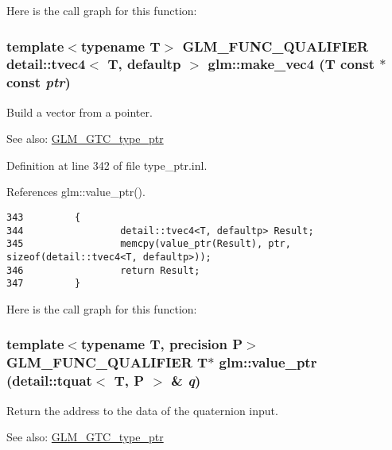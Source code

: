 Here is the call graph for this function:\hypertarget{group__gtc__type__ptr_gf44d3c8aa09a7a8021ae5312e2f1f091}{
\subsubsection[make\_\-vec4]{\setlength{\rightskip}{0pt plus 5cm}template$<$typename T$>$ GLM\_\-FUNC\_\-QUALIFIER detail::tvec4$<$ T, defaultp $>$ glm::make\_\-vec4 (T const $\ast$const  {\em ptr})}}
\label{group__gtc__type__ptr_gf44d3c8aa09a7a8021ae5312e2f1f091}


Build a vector from a pointer. \begin{Desc}
\item[See also:]\hyperlink{group__gtc__type__ptr}{GLM\_\-GTC\_\-type\_\-ptr} \end{Desc}


Definition at line 342 of file type\_\-ptr.inl.

References glm::value\_\-ptr().

\begin{Code}\begin{verbatim}343         {
344                 detail::tvec4<T, defaultp> Result;
345                 memcpy(value_ptr(Result), ptr, sizeof(detail::tvec4<T, defaultp>));
346                 return Result;
347         }
\end{verbatim}
\end{Code}




Here is the call graph for this function:\hypertarget{group__gtc__type__ptr_ga84b8d637d0b816514e2db6ce19cec6c}{
\subsubsection[value\_\-ptr]{\setlength{\rightskip}{0pt plus 5cm}template$<$typename T, precision P$>$ GLM\_\-FUNC\_\-QUALIFIER T$\ast$ glm::value\_\-ptr (detail::tquat$<$ T, P $>$ \& {\em q})}}
\label{group__gtc__type__ptr_ga84b8d637d0b816514e2db6ce19cec6c}


Return the address to the data of the quaternion input. \begin{Desc}
\item[See also:]\hyperlink{group__gtc__type__ptr}{GLM\_\-GTC\_\-type\_\-ptr} \end{Desc}


